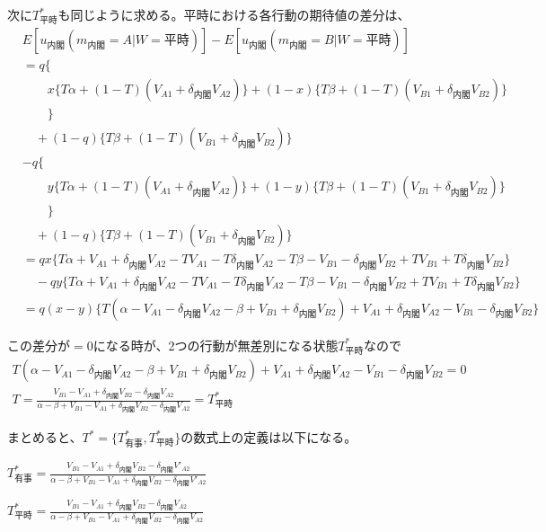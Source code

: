\documentclass[main.tex]{subfiles}
\begin{document}
次に$T^*_{平時}$も同じように求める。平時における各行動の期待値の差分は、
\begin{align*}
    & E[u_{内閣}(m_{内閣}=A|W=平時)] - E[u_{内閣}(m_{内閣}=B|W=平時)]\\
    & = q\lbrace \\
    & \quad\quad x \lbrace T\alpha + (1-T)(V_{A1} + \delta_{内閣} V_{A2}) \rbrace + (1-x)\lbrace T\beta + (1-T)(V_{B1} + \delta_{内閣} V_{B2}) \rbrace \\
    & \quad\quad \rbrace\\
    & \quad +(1-q)\lbrace T\beta + (1-T)(V_{B1} + \delta_{内閣} V_{B2}) \rbrace\\
    & - q\lbrace \\
    & \quad\quad y \lbrace T\alpha + (1-T)(V_{A1} + \delta_{内閣} V_{A2}) \rbrace + (1-y)\lbrace T\beta + (1-T)(V_{B1} + \delta_{内閣} V_{B2}) \rbrace \\
    & \quad\quad \rbrace\\
    & \quad +(1-q)\lbrace T\beta + (1-T)(V_{B1} + \delta_{内閣} V_{B2}) \rbrace\\
    & = qx \lbrace T\alpha + V_{A1} + \delta_{内閣}V_{A2} - TV_{A1} - T\delta_{内閣}V_{A2} - T\beta -V_{B1} -\delta_{内閣}V_{B2} + TV_{B1} + T\delta_{内閣}V_{B2} \rbrace\\
    & \quad -qy\lbrace T\alpha + V_{A1} + \delta_{内閣}V_{A2} - TV_{A1} - T\delta_{内閣}V_{A2} - T\beta -V_{B1} -\delta_{内閣}V_{B2} + TV_{B1} + T\delta_{内閣}V_{B2} \rbrace\\
    & = q(x-y)\lbrace T(\alpha -V_{A1} -\delta_{内閣}V_{A2} - \beta + V_{B1} + \delta_{内閣}V_{B2}) + V_{A1} + \delta_{内閣}V_{A2} - V_{B1} - \delta_{内閣}V_{B2}  \rbrace
\end{align*}

\noindent
この差分が$=0$になる時が、2つの行動が無差別になる状態$T^*_{平時}$なので
\begin{gather*}
    T(\alpha -V_{A1} -\delta_{内閣}V_{A2} - \beta + V_{B1} + \delta_{内閣}V_{B2}) + V_{A1} + \delta_{内閣}V_{A2} - V_{B1} - \delta_{内閣}V_{B2} = 0\\
    T = \frac{ V_{B1} - V_{A1} +\delta_{内閣}V_{B2} - \delta_{内閣}V_{A2} }{ \alpha-\beta + V_{B1}-V_{A1} + \delta_{内閣}V_{B2} - \delta_{内閣}V_{A2} }
    = T^*_{平時}
\end{gather*}

まとめると、$T^* = \lbrace T^*_{有事}, T^*_{平時} \rbrace$の数式上の定義は以下になる。
\begin{definition} $T^*_{有事} = \frac{ V_{B1} - V_{A1} +\delta_{内閣}V_{B2} - \delta_{内閣}V'_{A2} }{ \alpha-\beta + V_{B1}-V_{A1} + \delta_{内閣}V_{B2} - \delta_{内閣}V'_{A2} }$ \end{definition}
\begin{definition} $T^*_{平時} = \frac{ V_{B1} - V_{A1} +\delta_{内閣}V_{B2} - \delta_{内閣}V_{A2} }{ \alpha-\beta + V_{B1}-V_{A1} + \delta_{内閣}V_{B2} - \delta_{内閣}V_{A2} }$ \end{definition}
\end{document}
